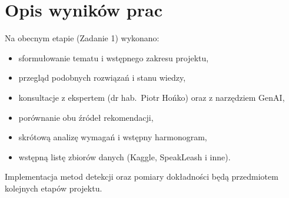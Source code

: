 \section{Opis wyników prac}

Na obecnym etapie (Zadanie 1) wykonano:

\begin{itemize}
	\item sformułowanie tematu i wstępnego zakresu projektu,
	\item przegląd podobnych rozwiązań i stanu wiedzy,
	\item konsultacje z ekspertem (dr hab.\ Piotr Hońko) oraz z narzędziem GenAI,
	\item porównanie obu źródeł rekomendacji,
	\item skrótową analizę wymagań i wstępny harmonogram,
	\item wstępną listę zbiorów danych (Kaggle, SpeakLeash i inne).
\end{itemize}

Implementacja metod detekcji oraz pomiary dokładności będą przedmiotem kolejnych etapów projektu.
